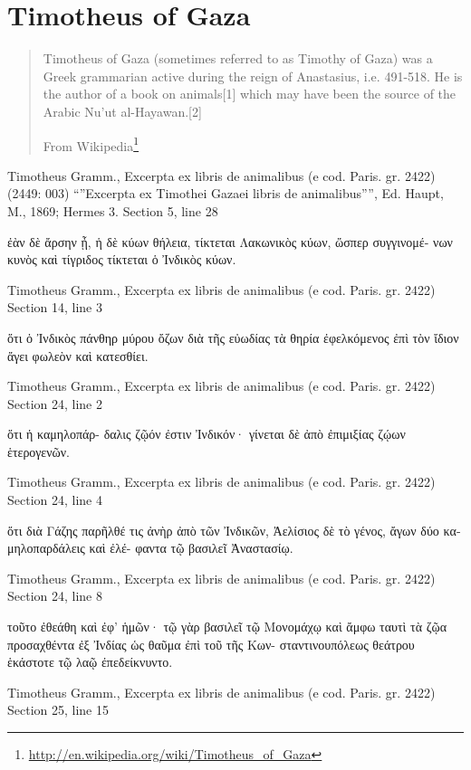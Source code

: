 \documentclass[12pt,letterpaper,twoside,final]{memoir}
\begin{document}
\section{Timotheus of Gaza}
\blockquote[From Wikipedia\footnote{\url{http://en.wikipedia.org/wiki/Timotheus_of_Gaza}}]{Timotheus of Gaza (sometimes referred to as Timothy of Gaza) was a Greek grammarian active during the reign of Anastasius, i.e. 491-518. He is the author of a book on animals[1] which may have been the source of the Arabic Nu'ut al-Hayawan.[2]}
\begin{greek}

Timotheus Gramm., Excerpta ex libris de animalibus (e cod. Paris. gr. 2422) (2449: 003)
“”Excerpta ex Timothei Gazaei libris de animalibus””, Ed. Haupt, M., 1869; Hermes 3.
Section 5, line 28

                                         ἐὰν δὲ ἄρσην ᾖ, ἡ δὲ 
κύων θήλεια, τίκτεται Λακωνικὸς κύων, ὥσπερ συγγινομέ-
νων κυνὸς καὶ τίγριδος τίκτεται ὁ Ἰνδικὸς κύων. 



Timotheus Gramm., Excerpta ex libris de animalibus (e cod. Paris. gr. 2422) 
Section 14, line 3

ὅτι ὁ Ἰνδικὸς πάνθηρ μύρου ὄζων διὰ τῆς εὐωδίας τὰ 
θηρία ἐφελκόμενος ἐπὶ τὸν ἴδιον ἄγει φωλεὸν καὶ κατεσθίει. 



Timotheus Gramm., Excerpta ex libris de animalibus (e cod. Paris. gr. 2422) 
Section 24, line 2

                                   ὅτι ἡ καμηλοπάρ-
δαλις ζῷόν ἐστιν Ἰνδικόν· γίνεται δὲ ἀπὸ ἐπιμιξίας ζῴων 
ἑτερογενῶν. 



Timotheus Gramm., Excerpta ex libris de animalibus (e cod. Paris. gr. 2422) 
Section 24, line 4

ὅτι διὰ Γάζης παρῆλθέ τις ἀνὴρ ἀπὸ τῶν Ἰνδικῶν, 
Ἀελίσιος δὲ τὸ γένος, ἄγων δύο καμηλοπαρδάλεις καὶ ἐλέ-
φαντα τῷ βασιλεῖ Ἀναστασίῳ. 



Timotheus Gramm., Excerpta ex libris de animalibus (e cod. Paris. gr. 2422) 
Section 24, line 8

                                   τοῦτο ἐθεάθη καὶ ἐφ' 
ἡμῶν· τῷ γὰρ βασιλεῖ τῷ Μονομάχῳ καὶ ἄμφω ταυτὶ τὰ 
ζῷα προσαχθέντα ἐξ Ἰνδίας ὡς θαῦμα ἐπὶ τοῦ τῆς Κων-
σταντινουπόλεως θεάτρου ἑκάστοτε τῷ λαῷ ἐπεδείκνυντο. 



Timotheus Gramm., Excerpta ex libris de animalibus (e cod. Paris. gr. 2422) 
Section 25, line 15


\end{greek}
\end{document}
